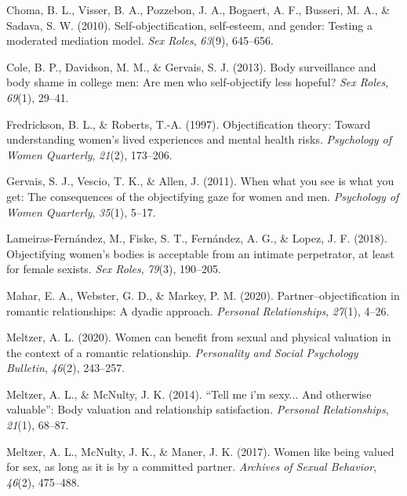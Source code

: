 \documentclass[
  english,
  man]{apa6}
\newlength{\cslhangindent}
\newlength{\cslentryspacingunit} %
\newenvironment{CSLReferences}[2] %
 {%
  \setlength{\parindent}{0pt}
  \ifodd #1
  \let\oldpar\par
  \def\par{\hangindent=\cslhangindent\oldpar}
  \fi
  \setlength{\parskip}{#2\cslentryspacingunit}
 }%
 {}
\begin{document}
\hypertarget{refs}{}
\begin{CSLReferences}{1}{0}
\leavevmode{}%
Choma, B. L., Visser, B. A., Pozzebon, J. A., Bogaert, A. F., Busseri, M. A., \& Sadava, S. W. (2010). Self-objectification, self-esteem, and gender: Testing a moderated mediation model. \emph{Sex Roles}, \emph{63}(9), 645--656.

\leavevmode{}%
Cole, B. P., Davidson, M. M., \& Gervais, S. J. (2013). Body surveillance and body shame in college men: Are men who self-objectify less hopeful? \emph{Sex Roles}, \emph{69}(1), 29--41.

\leavevmode{}%
Fredrickson, B. L., \& Roberts, T.-A. (1997). Objectification theory: Toward understanding women's lived experiences and mental health risks. \emph{Psychology of Women Quarterly}, \emph{21}(2), 173--206.

\leavevmode{}%
Gervais, S. J., Vescio, T. K., \& Allen, J. (2011). When what you see is what you get: The consequences of the objectifying gaze for women and men. \emph{Psychology of Women Quarterly}, \emph{35}(1), 5--17.

\leavevmode{}%
Lameiras-Fernández, M., Fiske, S. T., Fernández, A. G., \& Lopez, J. F. (2018). Objectifying women's bodies is acceptable from an intimate perpetrator, at least for female sexists. \emph{Sex Roles}, \emph{79}(3), 190--205.

\leavevmode{}%
Mahar, E. A., Webster, G. D., \& Markey, P. M. (2020). Partner--objectification in romantic relationships: A dyadic approach. \emph{Personal Relationships}, \emph{27}(1), 4--26.

\leavevmode{}%
Meltzer, A. L. (2020). Women can benefit from sexual and physical valuation in the context of a romantic relationship. \emph{Personality and Social Psychology Bulletin}, \emph{46}(2), 243--257.

\leavevmode{}%
Meltzer, A. L., \& McNulty, J. K. (2014). {``Tell me i'm sexy... And otherwise valuable''}: Body valuation and relationship satisfaction. \emph{Personal Relationships}, \emph{21}(1), 68--87.

\leavevmode{}%
Meltzer, A. L., McNulty, J. K., \& Maner, J. K. (2017). Women like being valued for sex, as long as it is by a committed partner. \emph{Archives of Sexual Behavior}, \emph{46}(2), 475--488.


\end{CSLReferences}
\end{document}
